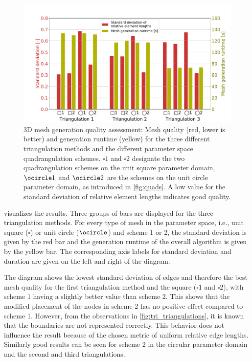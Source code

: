 \begin{figure}%
  \centering%
  \includegraphics[width=\textwidth]{images/fiber_creation/mesh_quality.pdf}%
  \caption{3D mesh generation quality assessment: Mesh quality (red, lower is better) and generation runtime (yellow) for the three different triangulation methods and the different parameter space quadrangulation schemes. $\square 1$ and $\square 2$ designate the two quadrangulation schemes on the unit square parameter domain, $\ocircle 1$ and $\ocircle 2$ are the schemes on the unit circle parameter domain, as introduced in \cref{fig:quads}. A low value for the standard deviation of relative element lengths indicates good quality.}%
  \label{fig:mesh_quality}%
\end{figure}

 visualizes the results. Three groups of bars are displayed for the three triangulation methods. For every type of mesh in the parameter space, i.e., unit square ($\square$) or unit circle ($\ocircle$) and scheme 1 or 2, the standard deviation is given by the red bar and the generation runtime of the overall algorithm is given by the yellow bar. The corresponding axis labels for standard deviation and duration are given on the left and right of the diagram.

The diagram shows the lowest standard deviation of edges and therefore the best mesh quality for the first triangulation method and the square ($\square 1$ and $\square 2$), with scheme 1 having a slightly better value than scheme 2. This shows that the modified placement of the nodes in scheme 2 has no positive effect compared to scheme 1.
However, from the observations in \cref{fig:tri_triangulations}, it is known that the boundaries are not represented correctly.
This behavior does not influence the result because of the chosen metric of uniform relative edge lengths.
Similarly good results can be seen for scheme 2 in the circular parameter domain and the second and third triangulations.

